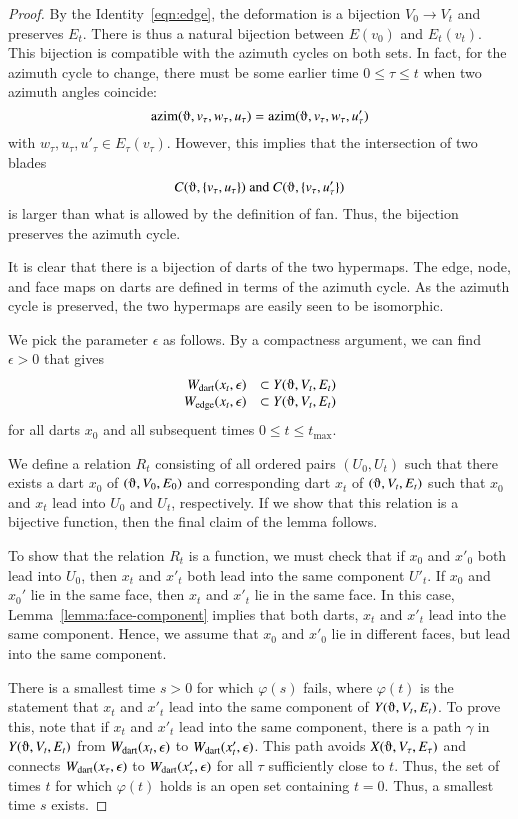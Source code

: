 \begin{proof} By the Identity~\ref{eqn:edge}, the deformation is
a bijection $V_0\to V_t$ and preserves $E_t$.  There
is thus a natural bijection between $E(v_0)$ and $E_t(v_t)$.
This bijection is compatible with the azimuth cycles on both
sets.  In fact, for the azimuth cycle to change, there must
be some earlier time $0\le\tau \le t$ when two azimuth angles coincide:
$$\op{azim}(\orgn,v_\tau,w_\tau,u_\tau) = \op{azim}(\orgn,v_\tau,w_\tau,u'_\tau)$$
with $w_\tau,u_\tau,u'_\tau\in E_\tau(v_\tau)$.  However, this
implies that the intersection of two blades 
   $$
   C(\orgn,\{v_\tau,u_\tau\}) \text{ and } C(\orgn,\{v_\tau,u'_\tau\})
   $$
is larger than what is allowed by the definition of fan.  Thus,
the bijection preserves the azimuth cycle.

It is clear that there is a bijection of darts of the two
hypermaps.   The edge, node, and face maps on darts are defined
in terms of the azimuth cycle.  As the azimuth cycle is
preserved, the two hypermaps are easily seen to be isomorphic.

We pick the parameter $\epsilon$ as follows.
By a compactness argument, we can find
$\epsilon>0$ that gives
   $$
   \begin{array}{rll}
   \Wdart(x_t,\epsilon)&\subset Y(\orgn,V_t,E_t)\\
   \Wedge(x_t,\epsilon)&\subset Y(\orgn,V_t,E_t)
   \end{array}
   $$
for all darts $x_0$ and all subsequent times $0\le t\le t_{\text{max}}$.

We define a relation $R_t$ consisting of all ordered pairs $(U_0,U_t)$
such that there exists a dart $x_0$ of $(\orgn,V_0,E_0)$ and 
corresponding dart $x_t$ of $(\orgn,V_t,E_t)$ such that $x_0$
and $x_t$ lead into $U_0$ and $U_t$, respectively.  If we show
that this relation is a bijective function, then the final claim
of the lemma follows.

To show that the relation $R_t$ is a function, we must check that
if $x_0$ and $x'_0$ both lead into $U_0$, then $x_t$ and $x'_t$
both lead into the same component $U'_t$.  If $x_0$ and $x_0'$
lie in the same face, then $x_t$ and $x'_t$ lie in the same face.
In this case, Lemma~\ref{lemma:face-component} 
implies that both darts, $x_t$
and $x'_t$ lead into the same component. 
Hence, we assume that $x_0$ and $x'_0$ lie in different faces, but lead
into the same component.  

There is a smallest time
$s>0$ for which $\varphi(s)$ fails, where 
 $\varphi(t)$ is the statement that $x_t$ and $x'_t$ lead
into the same component of $Y(\orgn,V_t,E_t)$.
To prove this, note that 
if $x_t$ and $x'_t$ lead into the same component, there is
a path $\gamma$ in $Y(\orgn,V_t,E_t)$
from $W_{\text{dart}}(x_t,\epsilon)$ to $W_{\text{dart}}(x'_t,\epsilon)$.  This path avoids 
$X(\orgn,V_{\tau},E_{\tau})$ and connects $W_{\text{dart}}(x_{\tau},\epsilon)$ to
$W_{\text{dart}}(x'_{\tau},\epsilon)$ for all $\tau$ sufficiently close to $t$.
Thus, the set of times $t$ for which $\varphi(t)$ holds is an
open set containing $t=0$.  Thus, a smallest time $s$ exists.


\end{proof}
